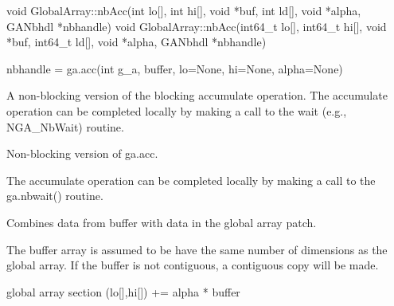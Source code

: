 \documentclass[12pt]{article}
\begin{document}
\begin{cxxapi}
\begin{cxxcode}
void GlobalArray::nbAcc(int lo[], int hi[],
        void *buf, int ld[], void *alpha, GANbhdl *nbhandle)
void GlobalArray::nbAcc(int64_t lo[], int64_t hi[],
        void *buf, int64_t ld[], void *alpha, GANbhdl *nbhandle)
\end{cxxcode}
\begin{funcargs}
\end{funcargs}
\end{cxxapi}

\begin{pyapi}
\begin{pycode}
nbhandle = ga.acc(int g_a, buffer, lo=None, hi=None, alpha=None)
\end{pycode}
\begin{funcargs}
\end{funcargs}
\end{pyapi}

\ncoll

\begin{desc}
A non-blocking version of the blocking accumulate operation. The accumulate
operation can be completed locally by making a call to the wait (e.g.,
NGA_NbWait) routine.

Non-blocking version of ga.acc.

The accumulate operation can be completed locally by making a call to the
ga.nbwait() routine.

Combines data from buffer with data in the global array patch.

The buffer array is assumed to be have the same number of dimensions as the global array. If the buffer is not contiguous, a contiguous copy will be made.

global array section (lo[],hi[]) += alpha * buffer
\end{desc}
\end{document}
